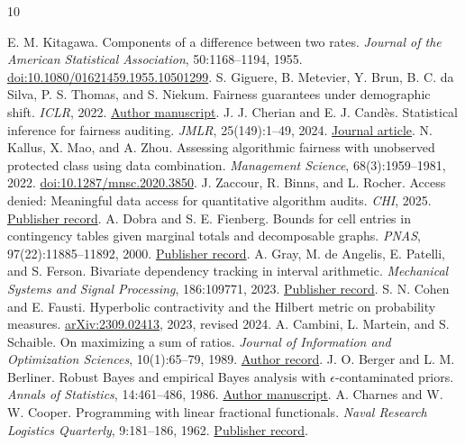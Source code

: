\documentclass[11pt]{article}
\begin{document}
\begin{thebibliography}{10}
\raggedright
{} E. M. Kitagawa. Components of a difference between two rates. \emph{Journal of the American Statistical Association}, 50:1168--1194, 1955. \href{https://doi.org/10.1080/01621459.1955.10501299}{doi:10.1080/01621459.1955.10501299}.
 S. Giguere, B. Metevier, Y. Brun, B. C. da Silva, P. S. Thomas, and S. Niekum. Fairness guarantees under demographic shift. \emph{ICLR}, 2022. \href{https://people.cs.umass.edu/~brun/pubs/Giguere22iclr.pdf}{Author manuscript}.
 J. J. Cherian and E. J. Cand\`es. Statistical inference for fairness auditing. \emph{JMLR}, 25(149):1--49, 2024. \href{https://www.jmlr.org/papers/v25/23-0739.html}{Journal article}.
 N. Kallus, X. Mao, and A. Zhou. Assessing algorithmic fairness with unobserved protected class using data combination. \emph{Management Science}, 68(3):1959--1981, 2022. \href{https://doi.org/10.1287/mnsc.2020.3850}{doi:10.1287/mnsc.2020.3850}.
 J. Zaccour, R. Binns, and L. Rocher. Access denied: Meaningful data access for quantitative algorithm audits. \emph{CHI}, 2025. \href{https://doi.org/10.1145/3706598.3713963}{Publisher record}.
 A. Dobra and S. E. Fienberg. Bounds for cell entries in contingency tables given marginal totals and decomposable graphs. \emph{PNAS}, 97(22):11885--11892, 2000. \href{https://doi.org/10.1073/pnas.97.22.11885}{Publisher record}.
 A. Gray, M. de Angelis, E. Patelli, and S. Ferson. Bivariate dependency tracking in interval arithmetic. \emph{Mechanical Systems and Signal Processing}, 186:109771, 2023. \href{https://doi.org/10.1016/j.ymssp.2022.109771}{Publisher record}.
 S. N. Cohen and E. Fausti. Hyperbolic contractivity and the Hilbert metric on probability measures. \href{https://arxiv.org/abs/2309.02413}{arXiv:2309.02413}, 2023, revised 2024.
 A. Cambini, L. Martein, and S. Schaible. On maximizing a sum of ratios. \emph{Journal of Information and Optimization Sciences}, 10(1):65--79, 1989. \href{https://arpi.unipi.it/handle/11568/14015}{Author record}.
 J. O. Berger and L. M. Berliner. Robust Bayes and empirical Bayes analysis with $\epsilon$-contaminated priors. \emph{Annals of Statistics}, 14:461--486, 1986. \href{https://www2.stat.duke.edu/~berger/papers/berliner-contaminated.pdf}{Author manuscript}.
 A. Charnes and W. W. Cooper. Programming with linear fractional functionals. \emph{Naval Research Logistics Quarterly}, 9:181--186, 1962. \href{https://doi.org/10.1002/nav.3800090303}{Publisher record}.

\end{thebibliography}
\end{document}
